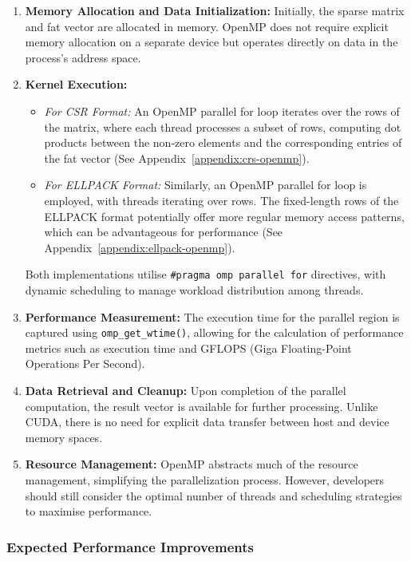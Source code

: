 \documentclass[12pt,oneside]{book} %
\begin{document}
\begin{enumerate}
    \item \textbf{Memory Allocation and Data Initialization:} Initially, the sparse matrix and fat vector are allocated in memory. OpenMP does not require explicit memory allocation on a separate device but operates directly on data in the process's address space.

    \item \textbf{Kernel Execution:}
          \begin{itemize}
              \item \textit{For CSR Format:} An OpenMP parallel for loop iterates over the rows of the matrix, where each thread processes a subset of rows, computing dot products between the non-zero elements and the corresponding entries of the fat vector (See Appendix~\ref{appendix:crs-openmp}).
              \item \textit{For ELLPACK Format:} Similarly, an OpenMP parallel for loop is employed, with threads iterating over rows. The fixed-length rows of the ELLPACK format potentially offer more regular memory access patterns, which can be advantageous for performance (See Appendix~\ref{appendix:ellpack-openmp}).
          \end{itemize}
          Both implementations utilise \texttt{\#pragma omp parallel for} directives, with dynamic scheduling to manage workload distribution among threads.

    \item \textbf{Performance Measurement:} The execution time for the parallel region is captured using \texttt{omp\_get\_wtime()}, allowing for the calculation of performance metrics such as execution time and GFLOPS (Giga Floating-Point Operations Per Second).

    \item \textbf{Data Retrieval and Cleanup:} Upon completion of the parallel computation, the result vector is available for further processing. Unlike CUDA, there is no need for explicit data transfer between host and device memory spaces.

    \item \textbf{Resource Management:} OpenMP abstracts much of the resource management, simplifying the parallelization process. However, developers should still consider the optimal number of threads and scheduling strategies to maximise performance.
\end{enumerate}

\subsubsection{Expected Performance Improvements}
\end{document}
